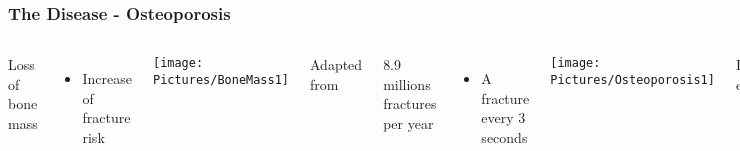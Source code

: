 \documentclass[xcolor=table,11pt]{beamer}
\begin{document}
	\begin{frame}[noframenumbering]
		\frametitle{The Disease - Osteoporosis}

		\begin{columns}
			Loss of bone mass
			\begin{itemize}
				\item Increase of fracture risk
			\end{itemize}

			\vspace{5mm}

			\texttt{[image: Pictures/BoneMass1]}\\
			\begin{center}
				\tiny{Adapted from \cite{p1}}
			\end{center}

			8.9 millions fractures per year
			\begin{itemize}
				\item A fracture every 3 seconds
			\end{itemize}

			\vspace{5mm}

			\texttt{[image: Pictures/Osteoporosis1]}\\
			\begin{center}
				\tiny{Image from eurospinepatientline.org}
			\end{center}
		\end{columns}

	\end{frame}
\end{document}
